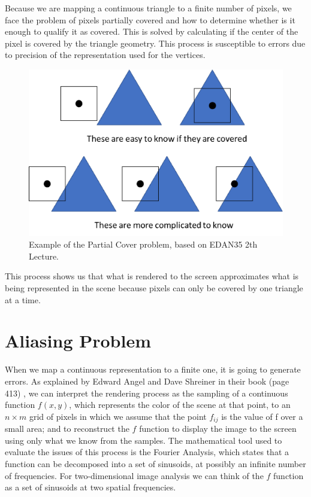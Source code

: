 \documentclass{cslthse-msc}
\begin{document}
Because we are mapping a continuous triangle to a finite number of pixels, we face the problem of pixels partially covered and how to determine whether is it enough to qualify it as covered. This is solved by calculating if the center of the pixel is covered by the triangle geometry. This process is susceptible to errors due to precision of the representation used for the vertices.  

\begin{figure}[!hbt]
	\centering
	\includegraphics[scale=0.5]{images/edge_testing.png} 
	\caption{Example of the Partial Cover problem, based on EDAN35 2th Lecture. ~\cite{Doggett2017EDAN35}}\label{fig:partialcover}
\end{figure}

This process shows us that what is rendered to the screen approximates what is being represented in the scene because pixels can only be covered by one triangle at a time. \cite{Moller2007, Doggett2017EDAN35}

\section{Aliasing Problem}
When we map a continuous representation to a finite one, it is going to generate errors. As explained by Edward Angel and Dave Shreiner in their book (page 413) \cite{Shreiner2011}, we can interpret the rendering process as the sampling of a continuous function \(f(x, y)\), which represents the color of the scene at that point, to an \(n\times m\)  grid of pixels in which we assume that the point \(f_{ij}\)  is the value of f over a small area; and to reconstruct the \(f\) function to display the image to the screen using only what we know from the samples. The mathematical tool used to evaluate the issues of this process is the Fourier Analysis, which states that a function can be decomposed into a set of sinusoids, at possibly an infinite number of frequencies. For two-dimensional image analysis we can think of the \(f\) function as a set of sinusoids at two spatial frequencies.
\end{document}
